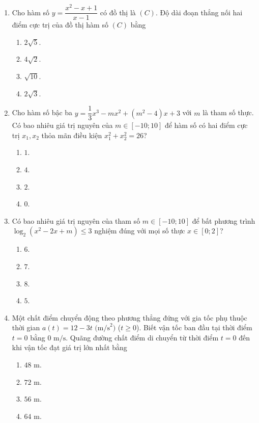 \documentclass[12pt,a4paper]{article}
\begin{document}
\begin{enumerate}[label=\textbf{Câu \arabic*:}, leftmargin=*]

\item Cho hàm số $y = \dfrac{x^2 - x + 1}{x - 1}$ có đồ thị là $(C)$. Độ dài đoạn thẳng nối hai điểm cực trị của đồ thị hàm số $(C)$ bằng
\begin{enumerate}[label=\Alph*.]
    \item $2\sqrt{5}$.
    \item $4\sqrt{2}$.
    \item $\sqrt{10}$.
    \item $2\sqrt{3}$.
\end{enumerate}

\item Cho hàm số bậc ba $y = \dfrac{1}{3}x^3 - mx^2 + (m^2 - 4)x + 3$ với $m$ là tham số thực. Có bao nhiêu giá trị nguyên của $m \in [-10; 10]$ để hàm số có hai điểm cực trị $x_1, x_2$ thỏa mãn điều kiện $x_1^2 + x_2^2 = 26$?
\begin{enumerate}[label=\Alph*.]
    \item $1$.
    \item $4$.
    \item $2$.
    \item $0$.
\end{enumerate}

\item Có bao nhiêu giá trị nguyên của tham số $m \in [-10; 10]$ để bất phương trình $\log_2(x^2 - 2x + m) \le 3$ nghiệm đúng với mọi số thực $x \in [0; 2]$?
\begin{enumerate}[label=\Alph*.]
    \item $6$.
    \item $7$.
    \item $8$.
    \item $5$.
\end{enumerate}

\item Một chất điểm chuyển động theo phương thẳng đứng với gia tốc phụ thuộc thời gian $a(t) = 12 - 3t\text{ (m/s}^2\text{)}$ ($t \ge 0$). Biết vận tốc ban đầu tại thời điểm $t = 0$ bằng $0\text{ m/s}$. Quãng đường chất điểm di chuyển từ thời điểm $t = 0$ đến khi vận tốc đạt giá trị lớn nhất bằng
\begin{enumerate}[label=\Alph*.]
    \item $48\text{ m}$.
    \item $72\text{ m}$.
    \item $56\text{ m}$.
    \item $64\text{ m}$.
\end{enumerate}


\end{enumerate}
\end{document}
